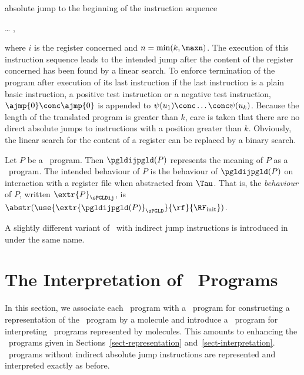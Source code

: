 \documentclass[fleqn]{llncs}
\begin{document}
absolute jump to the beginning of the instruction sequence
\begin{ldispl}
\begin{aeqns}
 \conc {} \conc \ldots \conc
{} \conc {} \conc {}\;,
\end{aeqns}
\end{ldispl}where $i$ is the register concerned and $n = \min(k,\maxn)$.
The execution of this instruction sequence leads to the intended jump
after the content of the register concerned has been found by a linear
search.
To enforce termination of the program after execution of its last
instruction if the last instruction is a plain basic instruction, a
positive test instruction or a negative test instruction,
$\ajmp{0} \conc \ajmp{0}$ is appended to
$\psi(u_1) \conc \ldots \conc \psi(u_k)$.
Because the length of the translated program is greater than $k$, care
is taken that there are no direct absolute jumps to instructions with a
position greater than $k$.
Obviously, the linear search for the content of a register can be
replaced by a binary search.

Let $P$ be a \PGLDij\ program.
Then $\pgldijpgld(P)$ represents the meaning of $P$ as a \PGLD\ program.
The intended behaviour of $P$ is the behaviour of $\pgldijpgld(P)$ on
interaction with a register file when abstracted from $\Tau$.
That is, the \emph{behaviour} of $P$, written $\extr{P}_\sPGLDij$, is
$\abstr(\use{\extr{\pgldijpgld(P)}_\sPGLD}{\rf}{\RF_\mathrm{init}})$.



A slightly different variant of \PGLD\ with indirect jump instructions
is introduced in~\cite{BM07e} under the same name.

\section{The Interpretation of \PGLDij\ Programs}
\label{sect-interpretation-ij}

In this section, we associate each \PGLDij\ program with a \PGA\ program
for constructing a representation of the \PGLDij\ program by a molecule
and introduce a \PGA\ program for interpreting \PGLDij\ programs
represented by molecules.
This amounts to enhancing the \PGA\ programs given in
Sections~\ref{sect-representation} and~\ref{sect-interpretation}.
\PGLDij\ programs without indirect absolute jump instructions are
represented and interpreted exactly as before.
\end{document}
